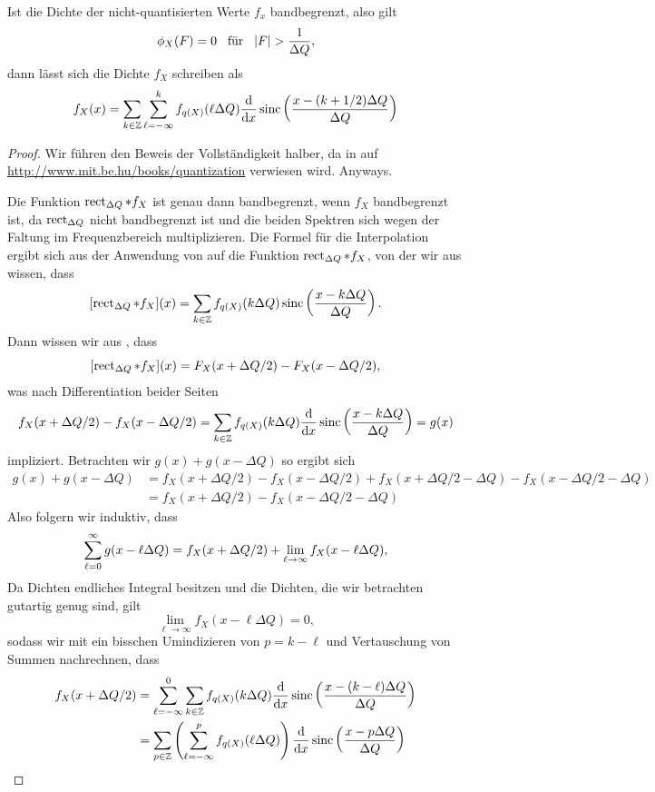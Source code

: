 \FloatBarrier
\begin{Thm}
\label{thm:random:widrow}
Ist die Dichte der nicht-quantisierten Werte $f_x$ bandbegrenzt, also gilt
\[
\phi_X(F) = 0 {\hspace{3mm} \text{für} \hspace{3mm}} {\left| F \right|} > \frac{1}{\Delta Q},
\]
dann lässt sich die Dichte $f_X$ schreiben als
\[
f_X(x) = {\sum\limits_{k \in \mathbb{Z}}^{}{
    {\sum\limits_{\ell = -\infty}^{k}{
        f_{q(X)}(\ell \Delta Q)
    }}
    \frac{\mathrm{d}}{\mathrm{d} x}\operatorname{sinc}\left(
        \frac{x - (k + 1/2) \Delta Q}{\Delta Q}
    \right)
}}
\]
\end{Thm}
\begin{proof}
Wir führen den Beweis der Vollständigkeit halber, da in \cite{widrow2008quantization} auf \url{http://www.mit.be.hu/books/quantization} verwiesen wird. 
Anyways.

Die Funktion $\operatorname{rect}_{\Delta Q} \ast f_X$ ist genau dann bandbegrenzt, wenn $f_X$ bandbegrenzt ist, da $\operatorname{rect}_{\Delta Q}$ nicht bandbegrenzt ist und die beiden Spektren sich wegen der Faltung im Frequenzbereich multiplizieren.
Die Formel für die Interpolation ergibt sich aus der Anwendung von  auf die Funktion $\operatorname{rect}_{\Delta Q} \ast f_X$, von der wir aus  wissen, dass
\[
[\operatorname{rect}_{\Delta Q} \ast f_X](x) = {\sum\limits_{k \in \mathbb{Z}}^{}{
    f_{q(X)}(k \Delta Q) \operatorname{sinc}\left(\frac{x - k \Delta Q}{\Delta Q}\right).
}}
\]
Dann wissen wir aus , dass 
\[
[\operatorname{rect}_{\Delta Q} \ast f_X](x) = F_{X}(x + \Delta Q/2) - F_{X}(x - \Delta Q/2),
\]
was nach Differentiation beider Seiten 
\[
f_{X}(x + \Delta Q/2) - f_{X}(x - \Delta Q/2) = 
    {\sum\limits_{k \in \mathbb{Z}}^{}{
        f_{q(X)}(k \Delta Q) \frac{\mathrm{d}}{\mathrm{d} x} \operatorname{sinc}\left(\frac{x - k \Delta Q}{\Delta Q}\right)
    }} 
    = g(x)
\]
impliziert.
Betrachten wir $g(x) + g(x - \Delta Q)$ so ergibt sich
\begin{align*}
g(x) + g(x - \Delta Q)
    & = f_{X}(x + \Delta Q/2) - f_{X}(x - \Delta Q/2)
      + f_{X}(x + \Delta Q/2 - \Delta Q) - f_{X}(x - \Delta Q/2 - \Delta Q) \\
    & = f_{X}(x + \Delta Q/2) - f_{X}(x - \Delta Q/2 - \Delta Q)
\end{align*}
Also folgern wir induktiv, dass
\[
{\sum\limits_{\ell = 0}^{\infty}{
    g(x - \ell \Delta Q)
}} = f_X(x + \Delta Q / 2) + \lim_{\ell \rightarrow \infty} f_X(x - \ell \Delta Q), 
\]
Da Dichten endliches Integral besitzen und die Dichten, die wir betrachten gutartig genug sind, gilt
\[
\lim_{\ell \rightarrow \infty} f_X(x - \ell \Delta Q) = 0,
\]
sodass wir mit ein bisschen Umindizieren von $p = k - \ell$ und Vertauschung von Summen nachrechnen, dass
\begin{align*}
    f_X(x + \Delta Q / 2) 
    & = {\sum\limits_{\ell = - \infty}^{0}{
        {\sum\limits_{k \in \mathbb{Z}}^{}{
            f_{q(X)}(k \Delta Q) \frac{\mathrm{d}}{\mathrm{d} x} \operatorname{sinc}\left(\frac{x - (k - \ell) \Delta Q}{\Delta Q}\right)
        }}
    }} \\
    & = {\sum\limits_{p \in \mathbb{Z}}^{}{
        \left({\sum\limits_{\ell = - \infty}^{p}{
            f_{q(X)}(\ell \Delta Q)
        }}\right) 
        \frac{\mathrm{d}}{\mathrm{d} x} \operatorname{sinc}\left(\frac{x - p \Delta Q}{\Delta Q}\right)
    }}
\end{align*}

\end{proof}

